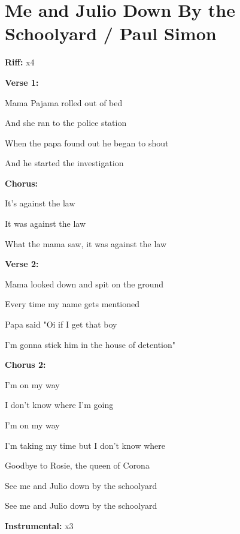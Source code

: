 \section{Me and Julio Down By the Schoolyard / Paul Simon}\label{sec:meandjulio}

\Amajor
\DmajorEasy
\EmajorEasy
\Bseven

\textbf{Riff:}
 x4

\textbf{Verse 1:}

 Mama Pajama rolled out of bed

And she ran to the police station

When the papa found out he began to shout

And he started the investigation 

\textbf{Chorus:}

It's against the law

It was against the law

What the mama saw, it was against the law

\textbf{Verse 2:}

 Mama looked down and spit on the ground

Every time my name gets mentioned

Papa said "Oi if I get that boy

I'm gonna stick him in the house of detention"


\textbf{Chorus 2:}

I'm on my way

I don't know where I'm going

I'm on my way

I'm taking my time but I don't know where

Goodbye to Rosie, the queen of Corona

See me and Julio down by the schoolyard 

See me and Julio down by the schoolyard 


\textbf{Instrumental:}
 x3

